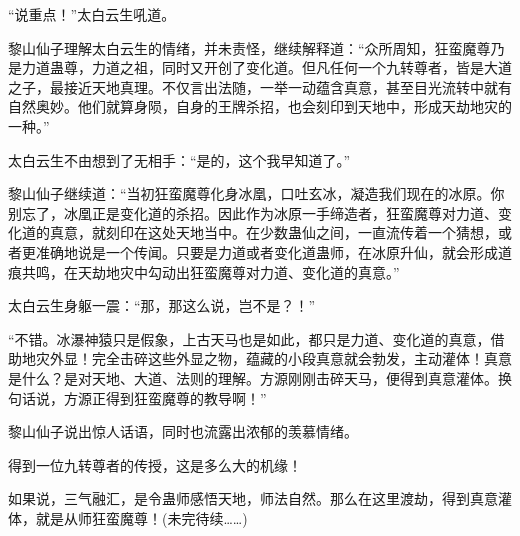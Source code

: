 \begin{this_body}
“说重点！”太白云生吼道。

黎山仙子理解太白云生的情绪，并未责怪，继续解释道：“众所周知，狂蛮魔尊乃是力道蛊尊，力道之祖，同时又开创了变化道。但凡任何一个九转尊者，皆是大道之子，最接近天地真理。不仅言出法随，一举一动蕴含真意，甚至目光流转中就有自然奥妙。他们就算身陨，自身的王牌杀招，也会刻印到天地中，形成天劫地灾的一种。”

太白云生不由想到了无相手：“是的，这个我早知道了。”

黎山仙子继续道：“当初狂蛮魔尊化身冰凰，口吐玄冰，凝造我们现在的冰原。你别忘了，冰凰正是变化道的杀招。因此作为冰原一手缔造者，狂蛮魔尊对力道、变化道的真意，就刻印在这处天地当中。在少数蛊仙之间，一直流传着一个猜想，或者更准确地说是一个传闻。只要是力道或者变化道蛊师，在冰原升仙，就会形成道痕共鸣，在天劫地灾中勾动出狂蛮魔尊对力道、变化道的真意。”

太白云生身躯一震：“那，那这么说，岂不是？！”

“不错。冰瀑神猿只是假象，上古天马也是如此，都只是力道、变化道的真意，借助地灾外显！完全击碎这些外显之物，蕴藏的小段真意就会勃发，主动灌体！真意是什么？是对天地、大道、法则的理解。方源刚刚击碎天马，便得到真意灌体。换句话说，方源正得到狂蛮魔尊的教导啊！”

黎山仙子说出惊人话语，同时也流露出浓郁的羡慕情绪。

得到一位九转尊者的传授，这是多么大的机缘！

如果说，三气融汇，是令蛊师感悟天地，师法自然。那么在这里渡劫，得到真意灌体，就是从师狂蛮魔尊！(未完待续……)

\end{this_body}

